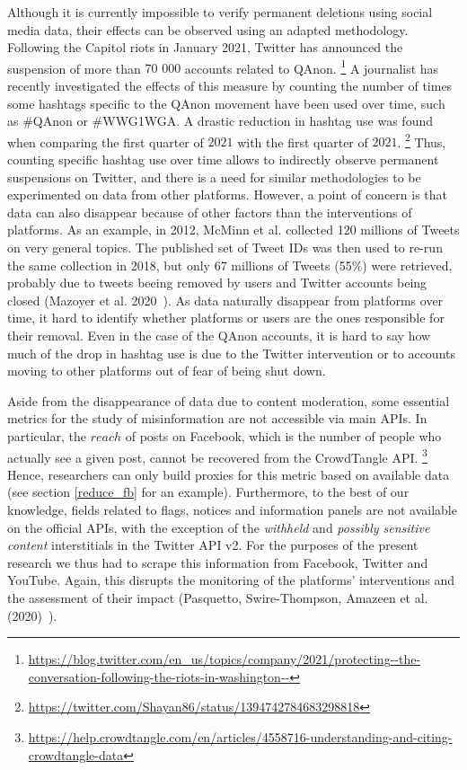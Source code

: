 \documentclass{article}
\begin{document}
Although it is currently impossible to verify permanent deletions using social media data, their effects can be observed using an adapted methodology.
Following the Capitol riots in January 2021, Twitter has announced the suspension of more than $70$ $000$ accounts related to QAnon.
\footnote{\url{https://blog.twitter.com/en_us/topics/company/2021/protecting--the-conversation-following-the-riots-in-washington--}} 
A journalist has recently investigated the effects of this measure by counting the number of times some hashtags specific to the QAnon movement have been used over time, such as \#QAnon or \#WWG1WGA.
A drastic reduction in hashtag use was found when comparing the first quarter of $2021$ with the first quarter of $2021$.
\footnote{\url{https://twitter.com/Shayan86/status/1394742784683298818}}
Thus, counting specific hashtag use over time allows to indirectly observe permanent suspensions on Twitter, and there is a need for similar methodologies to be experimented on data from other platforms.
However, a point of concern is that data can also disappear because of other factors than the interventions of platforms.
As an example, in 2012, McMinn et al. \cite{mcminn2013building} collected 120 millions of Tweets on very general topics. 
The published set of Tweet IDs was then used to re-run the same collection in 2018, but only 67 millions of Tweets (55\%) were retrieved, probably due to tweets beeing removed by users and Twitter accounts being closed (Mazoyer et al. 2020~\cite{mazoyer2020french}).
As data naturally disappear from platforms over time, it hard to identify whether platforms or users are the ones responsible for their removal. 
Even in the case of the QAnon accounts, it is hard to say how much of the drop in hashtag use is due to the Twitter intervention or to accounts moving to other platforms out of fear of being shut down.

\smallskip 

Aside from the disappearance of data due to content moderation, some essential metrics for the study of misinformation are not accessible via main APIs. 
In particular, the $reach$ of posts on Facebook, which is the number of people who actually see a given post, cannot be recovered from the CrowdTangle API.
\footnote{\url{https://help.crowdtangle.com/en/articles/4558716-understanding-and-citing-crowdtangle-data}} 
Hence, researchers can only build proxies for this metric based on available data (see section \ref{reduce_fb} for an example). 
Furthermore, to the best of our knowledge, fields related to flags, notices and information panels are not available on the official APIs, with the exception of the {\it withheld}  and {\it possibly sensitive content} interstitials in the Twitter API v2. 
For the purposes of the present research we thus had to scrape this information from Facebook, Twitter and YouTube. 
Again, this disrupts the monitoring of the platforms' interventions and the assessment of their impact (Pasquetto, Swire-Thompson, Amazeen et al. (2020)~\cite{pasquetto}).
\end{document}
